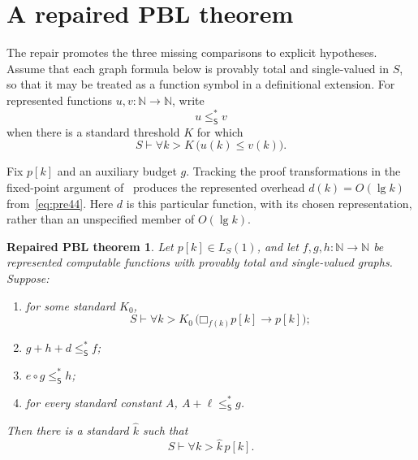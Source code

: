 \documentclass[11pt]{article}
\newtheorem*{repairedtheorem}{Repaired PBL theorem}
\theoremstyle{definition}
\theoremstyle{remark}
\newcommand{\N}{\mathbb{N}}
\newcommand{\Sth}{\mathsf{S}}
\newcommand{\elln}{\ell}
\newcommand{\Boxb}[1]{\mathord{\Box}_{#1}}
\newcommand{\leSstar}{\mathrel{\leq_{\Sth}^{*}}}
\begin{document}
\section{A repaired PBL theorem}\label{sec:pbl-repair}

The repair promotes the three missing comparisons to explicit hypotheses.  Assume that each graph formula below is provably total and single-valued in $S$, so that it may be treated as a function symbol in a definitional extension.  For represented functions $u,v:\N\to\N$, write
\[
  u\leSstar v
\]
when there is a standard threshold $K$ for which
\[
  S\vdash\forall k>K\,\bigl(u(k)\leq v(k)\bigr).
\]

Fix $p[k]$ and an auxiliary budget $g$.  Tracking the proof transformations in the fixed-point argument of~\cite{Critch} produces the represented overhead $d(k)=O(\lg k)$ from~\eqref{eq:pre44}.  Here $d$ is this particular function, with its chosen representation, rather than an unspecified member of $O(\lg k)$.

\begin{repairedtheorem}
Let $p[k]\in L_S(1)$, and let $f,g,h:\N\to\N$ be represented computable functions with provably total and single-valued graphs.  Suppose:
\begin{enumerate}[label=\textup{(\arabic*)},leftmargin=2.2em]
  \item for some standard $K_0$,
  \[
    S\vdash\forall k>K_0\,
    \bigl(\Boxb{f(k)}p[k]\to p[k]\bigr);
  \]
  \item $g+h+d\leSstar f$;
  \item $e\circ g\leSstar h$;
  \item for every standard constant $A$, $A+\elln\leSstar g$.
\end{enumerate}
Then there is a standard $\widehat{k}$ such that
\[
  S\vdash\forall k>\widehat{k}\,p[k].
\]
\end{repairedtheorem}
\end{document}
